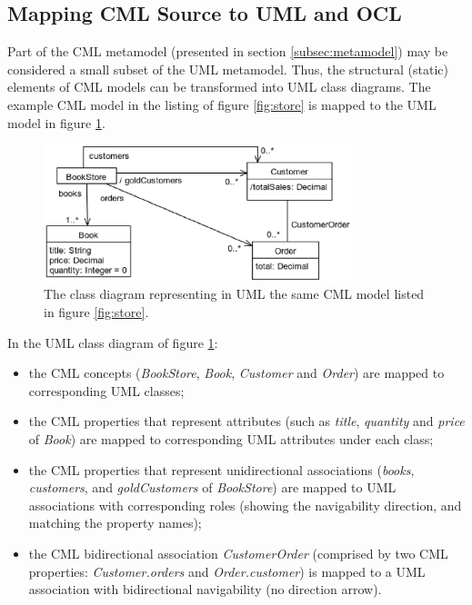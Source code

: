 \subsection{Mapping CML Source to UML and OCL}\label{subsec:mapping}

Part of the CML metamodel (presented in section \ref{subsec:metamodel}) may be considered a small subset of the UML  \cite{uml} metamodel.
Thus, the structural (static) elements of CML models can be transformed into UML class diagrams. The example CML model in the listing of figure \ref{fig:store} is mapped to the UML model in figure \ref{fig:uml}.

\begin{figure}
\centering
\includegraphics[width=0.8\textwidth]{language/diagram-uml}
\caption{The class diagram representing in UML  \cite{uml} the same CML model listed in figure \ref{fig:store}.}
\label{fig:uml}
\end{figure}

In the UML class diagram of figure \ref{fig:uml}:
\begin{itemize}
\item the CML concepts (\emph{BookStore}, \emph{Book}, \emph{Customer} and \emph{Order}) are mapped to corresponding UML classes;
\item the CML properties that represent attributes
(such as \emph{title}, \emph{quantity} and \emph{price} of \emph{Book})
are mapped to corresponding UML attributes under each class;
\item the CML properties that represent unidirectional associations
(\emph{books}, \emph{customers}, and \emph{goldCustomers} of \emph{BookStore})
are mapped to UML associations with corresponding roles
(showing the navigability direction, and matching the property names);
\item the CML bidirectional association \emph{CustomerOrder}
(comprised by two CML properties: \emph{Customer.orders} and \emph{Order.customer})
is mapped to a UML association with bidirectional navigability (no direction arrow).
\end{itemize}

